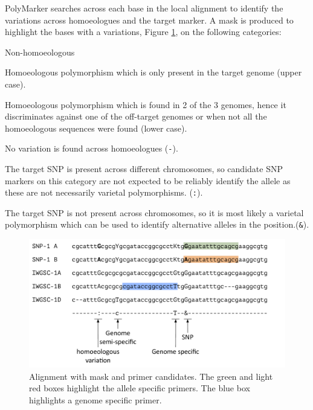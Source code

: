 PolyMarker searches across each base in the local alignment to identify the variations across homoeologues and the target marker.
A mask is produced to highlight the bases with a variations, Figure \ref{fig:poly:mask}, on the following categories:
\begin{labeling}{Non-homoeologous}
\item [Specific] Homoeologous polymorphism which is only present in the target genome (upper case).
\item [Semi-specific] Homoeologous polymorphism which is found in 2 of the 3 genomes, hence it discriminates against one of the off-target genomes or when not all the homoeologous sequences were found (lower case).
\item [Non-specific] No variation is found across homoeologues (\texttt{-}).
\item [Homoeologous] The target SNP is present across different chromosomes, so candidate SNP markers on this category are not expected to be reliably identify the allele as these are not necessarily varietal polymorphisms. (\texttt{:}).
\item [Non-homoeologous] The target SNP is not present across chromosomes, so it is most likely a varietal polymorphism which can be used to identify alternative alleles in the position.(\texttt{\&}).
\end{labeling} 


\begin{figure}
\includegraphics[width=1\textwidth]{PolyMarker/Figures/aln/mask.pdf}
\caption{Alignment with mask and primer candidates. The green and light red boxes highlight the allele specific primers. The blue box highlights a genome specific primer. }
\label{fig:poly:mask}
\end{figure}

